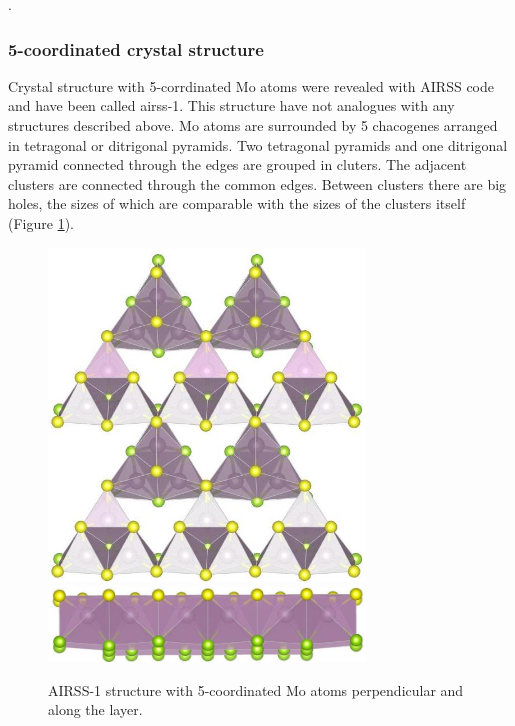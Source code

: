 .\documentclass[a4paperm]{article}
\begin{document}
\subsubsection{5-coordinated crystal structure}

Crystal structure with 5-corrdinated Mo atoms were revealed with AIRSS code and have been called airss-1.
This structure have not analogues with any structures described above.
Mo atoms are surrounded by 5 chacogenes arranged in tetragonal or ditrigonal pyramids.
Two tetragonal pyramids and one ditrigonal pyramid connected through the edges are grouped in cluters.
The adjacent clusters are connected through the common edges.
Between clusters there are big holes, the sizes of which are comparable with the sizes of the clusters itself (Figure \ref{airss-1}).

\begin{figure}[H]
        \includegraphics[width=0.75\textwidth]{airss-1-1.jpg} \\ \vspace{3mm}
        \includegraphics[width=0.75\textwidth]{airss-1-2.jpg}
        \caption{AIRSS-1 structure with 5-coordinated Mo atoms perpendicular and along the layer.}
\label{airss-1}
\end{figure}
\end{document}
